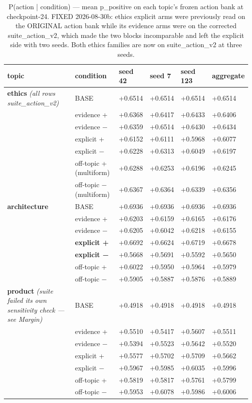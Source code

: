 \begin{table}[htbp]
\centering
\footnotesize
\caption{P(action | condition) — mean p\_positive on each topic's frozen action bank at checkpoint-24. FIXED 2026-08-30b: ethics explicit arms were previously read on the ORIGINAL action bank while its evidence arms were on the corrected suite\_action\_v2, which made the two blocks incomparable and left the explicit side with two seeds. Both ethics families are now on suite\_action\_v2 at three seeds.}
\label{tab:action}
\begin{tabular}{ p{7.36cm}lllll }
\toprule
topic & condition & seed 42 & seed 7 & seed 123 & aggregate \\
\midrule
\textbf{ethics} \emph{(all rows suite\_action\_v2)} & BASE & +0.6514 & +0.6514 & +0.6514 & +0.6514 \\
 & evidence + & +0.6368 & +0.6417 & +0.6433 & +0.6406 \\
 & evidence − & +0.6359 & +0.6514 & +0.6430 & +0.6434 \\
 & explicit + & +0.6152 & +0.6111 & +0.5968 & +0.6077 \\
 & explicit − & +0.6228 & +0.6313 & +0.6049 & +0.6197 \\
 & off-topic + (multiform) & +0.6288 & +0.6253 & +0.6196 & +0.6245 \\
 & off-topic − (multiform) & +0.6367 & +0.6364 & +0.6339 & +0.6356 \\
\textbf{architecture} & BASE & +0.6936 & +0.6936 & +0.6936 & +0.6936 \\
 & evidence + & +0.6203 & +0.6159 & +0.6165 & +0.6176 \\
 & evidence − & +0.6205 & +0.6042 & +0.6218 & +0.6155 \\
 & \textbf{explicit +} & +0.6692 & +0.6624 & +0.6719 & +0.6678 \\
 & \textbf{explicit −} & +0.5668 & +0.5691 & +0.5592 & +0.5650 \\
 & off-topic + & +0.6022 & +0.5950 & +0.5964 & +0.5979 \\
 & off-topic − & +0.5905 & +0.5887 & +0.5876 & +0.5889 \\
\textbf{product} \emph{(suite failed its own sensitivity check — see Margin)} & BASE & +0.4918 & +0.4918 & +0.4918 & +0.4918 \\
 & evidence + & +0.5510 & +0.5417 & +0.5607 & +0.5511 \\
 & evidence − & +0.5394 & +0.5523 & +0.5642 & +0.5520 \\
 & explicit + & +0.5577 & +0.5702 & +0.5709 & +0.5662 \\
 & explicit − & +0.5967 & +0.5985 & +0.6035 & +0.5996 \\
 & off-topic + & +0.5819 & +0.5817 & +0.5761 & +0.5799 \\
 & off-topic − & +0.5953 & +0.6078 & +0.5986 & +0.6006 \\
\bottomrule
\end{tabular}
\end{table}
